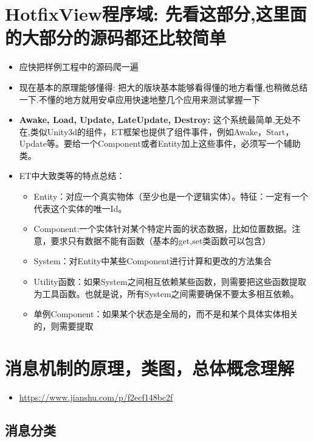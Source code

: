 \documentclass[9pt, b5paper]{article}
\begin{document}
\section{HotfixView程序域: 先看这部分,这里面的大部分的源码都还比较简单}
\label{sec-21}
\begin{itemize}
\item 应快把样例工程中的源码爬一遍
\item 现在基本的原理能够懂得: 把大的版块基本能够看得懂的地方看懂,也稍微总结一下.不懂的地方就用安卓应用快速地整几个应用来测试掌握一下
\item \textbf{Awake, Load, Update, LateUpdate, Destroy:} 这个系统最简单,无处不在,类似Unity3d的组件，ET框架也提供了组件事件，例如Awake，Start，Update等。要给一个Component或者Entity加上这些事件，必须写一个辅助类。
\item ET中大致类等的特点总结：
\begin{itemize}
\item Entity：对应一个真实物体（至少也是一个逻辑实体）。特征：一定有一个代表这个实体的唯一Id。
\item Component:一个实体针对某个特定片面的状态数据，比如位置数据。注意，要求只有数据不能有函数（基本的get,set类函数可以包含）
\item System：对Entity中某些Component进行计算和更改的方法集合
\item Utility函数：如果System之间相互依赖某些函数，则需要把这些函数提取为工具函数。也就是说，所有System之间需要确保不要太多相互依赖。
\item 单例Component：如果某个状态是全局的，而不是和某个具体实体相关的，则需要提取
\end{itemize}
\end{itemize}

\section{消息机制的原理，类图，总体概念理解}
\label{sec-22}
\begin{itemize}
\item \url{https://www.jianshu.com/p/f2ecf148bc2f}
\end{itemize}
\subsection{消息分类}
\label{sec-22-1}
\end{document}
